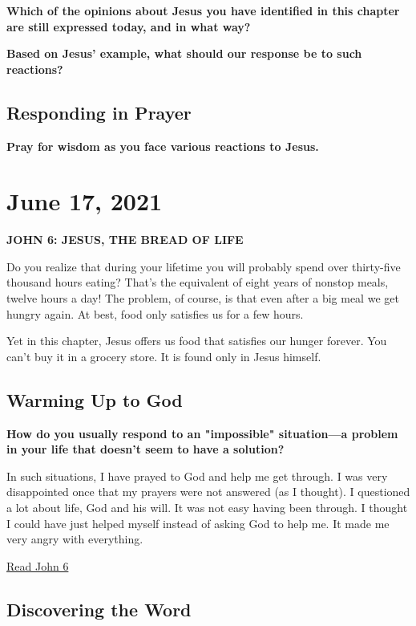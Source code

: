 \documentclass[11pt]{article}
\begin{document}
\textbf{\textbf{Which of the opinions about Jesus you have identified in this chapter are still expressed today, and in what way?}}

\textbf{\textbf{Based on Jesus' example, what should our response be to such reactions?}}

\subsection{Responding in Prayer}
\label{sec:org41ac020}

\textbf{\textbf{Pray for wisdom as you face various reactions to Jesus.}}

\section{June 17, 2021}
\label{sec:orgd77c67a}

\textbf{\textbf{JOHN 6: JESUS, THE BREAD OF LIFE}}

Do you realize that during your lifetime you will probably spend over
thirty-five thousand hours eating? That's the equivalent of eight
years of nonstop meals, twelve hours a day! The problem, of course,
is that even after a big meal we get hungry again. At best, food only
satisfies us for a few hours.

Yet in this chapter, Jesus offers us food that satisfies our hunger
forever. You can't buy it in a grocery store. It is found only in
Jesus himself.

\subsection{Warming Up to God}
\label{sec:orga2f62fc}

\textbf{\textbf{How do you usually respond to an "impossible" situation—a problem in your life that doesn't seem to have a solution?}}

In such situations, I have prayed to God and help me get through. I
was very disappointed once that my prayers were not answered (as I
thought). I questioned a lot about life, God and his will. It was not
easy having been through. I thought I could have just helped myself
instead of asking God to help me. It made me very angry with everything. 

\href{https://www.biblegateway.com/passage/?search=John\%206\&version=NIV\&interface=print}{Read John 6}

\subsection{Discovering the Word}
\label{sec:org0e9c6a2}
\end{document}
